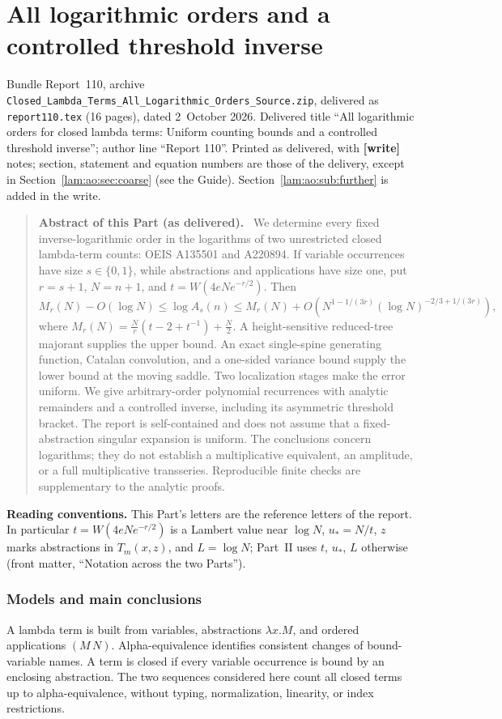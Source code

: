 \documentclass[11pt,a4paper]{article}
\numberwithin{equation}{section}
\theoremstyle{remark}
\newcommand{\file}[1]{\nolinkurl{#1}}
\newenvironment{partabstract}{\begin{quote}\small\noindent\textbf{Abstract of this Part (as delivered).}\ }{\end{quote}}
\newcommand{\partsource}[1]{\par\noindent\begin{minipage}{\textwidth}\small #1\end{minipage}\par\medskip}
\begin{document}
\part{All logarithmic orders and a controlled threshold inverse}\label{lam:ao:part}
\partsource{Bundle Report~110, archive \file{Closed_Lambda_Terms_All_Logarithmic_Orders_Source.zip}, delivered as \file{report110.tex} (16 pages), dated 2~October 2026. Delivered title ``All logarithmic orders for closed lambda terms: Uniform counting bounds and a controlled threshold inverse''; author line ``Report 110''. Printed as delivered, with \textbf{[write]} notes; section, statement and equation numbers are those of the delivery, except in Section~\ref{lam:ao:sec:coarse} (see the Guide). Section~\ref{lam:ao:sub:further} is added in the write.}
\begin{partabstract}
We determine every fixed inverse-logarithmic order in the logarithms of two unrestricted closed lambda-term counts: OEIS A135501 and A220894. If variable occurrences have size $s\in\{0,1\}$, while abstractions and applications have size one, put $r=s+1$, $N=n+1$, and $t=W(4eNe^{-r/2})$. Then
\[
 M_r(N)-O(\log N)\le\log A_s(n)\le M_r(N)+O\!\left(N^{1-1/(3r)}(\log N)^{-2/3+1/(3r)}\right),
\]
where $M_r(N)=\frac Nr(t-2+t^{-1})+\frac N2$. A height-sensitive reduced-tree majorant supplies the upper bound. An exact single-spine generating function, Catalan convolution, and a one-sided variance bound supply the lower bound at the moving saddle. Two localization stages make the error uniform. We give arbitrary-order polynomial recurrences with analytic remainders and a controlled inverse, including its asymmetric threshold bracket. The report is self-contained and does not assume that a fixed-abstraction singular expansion is uniform. The conclusions concern logarithms; they do not establish a multiplicative equivalent, an amplitude, or a full multiplicative transseries. Reproducible finite checks are supplementary to the analytic proofs.
\end{partabstract}
\noindent\textbf{Reading conventions.} This Part's letters are the reference letters of the report. In particular $t=W(4eNe^{-r/2})$ is a Lambert value near $\log N$, $u_*=N/t$, $z$ marks abstractions in $T_m(x,z)$, and $L=\log N$; Part~II uses $t$, $u_*$, $L$ otherwise (front matter, ``Notation across the two Parts'').

\section{Models and main conclusions}
A lambda term is built from variables, abstractions $\lambda x.M$, and ordered applications $(M\,N)$. Alpha-equivalence identifies consistent changes of bound-variable names. A term is closed if every variable occurrence is bound by an enclosing abstraction. The two sequences considered here count all closed terms up to alpha-equivalence, without typing, normalization, linearity, or index restrictions.
\end{document}
